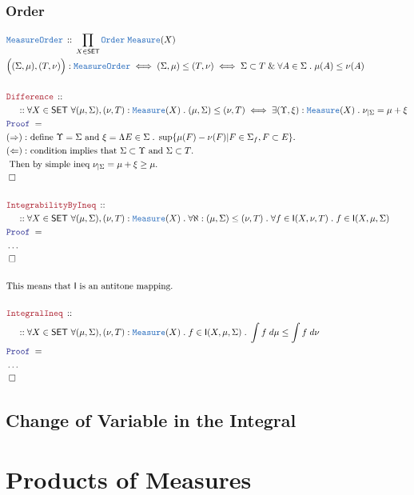 \documentclass[12pt]{scrartcl}
\newcommand{\TYPE}[1]{\textcolor{NavyBlue}{\mathtt{#1}}}
\newcommand{\LOGIC}[1]{\textcolor{Blue}{\mathtt{#1}}}
\newcommand{\THM}[1]{\textcolor{Maroon}{\mathtt{#1}}}
\renewcommand{\.}{\; . \;}
\newcommand{\Theorem}[2]{& \THM{#1} \, :: \, #2 \\ & \Proof = \\ }
\newcommand{\DeclareType}[2]{& \TYPE{#1} \, :: \, #2 \\}
\newcommand{\DefineNamedType}[4]{& #1 : \TYPE{#2} \iff #3 \iff #4 \\}
\newcommand{\NewLine}{\\ & \kern 1pc}
\newcommand{\Page}[1]{ \begin{align*} #1 \end{align*}   }
\newcommand{\NoProof}{ & \ldots \\ \EndProof}
\renewcommand{\And}{\; \& \;}
\newcommand{\QED}{\; \square}
\newcommand{\EndProof}{& \QED \\}
\newcommand{\Proof}{\LOGIC{Proof} \; }
\newcommand{\Explain}[1]{& \text{#1.} \\}
\newcommand{\SET}{\mathsf{SET}}
\newcommand{\Measure}{\TYPE{Measure}}
\newcommand{\Integrable}{\mathsf{I}}
\begin{document}
\subsubsection{Order}
\Page{
	\DeclareType{MeasureOrder}{\prod_{X \in \SET} \TYPE{Order} \; \Measure(X)}
	\DefineNamedType{\Big( (\Sigma,\mu),(T,\nu) \Big)}{MeasureOrder}
	{(\Sigma,\mu) \le (T,\nu)}{\Sigma \subset T  \And \forall A \in \Sigma \. \mu(A) \le \nu(A) }
	\\
	\Theorem{Difference}
	{
		\NewLine :: 		
		\forall X \in \SET \
		\forall (\mu,\Sigma),(\nu,T) : \Measure(X) \.
		(\mu,\Sigma) \le (\nu,T) \iff \exists (\Upsilon, \xi) : \Measure(X) \.
		\nu_{|\Sigma} = \mu + \xi	
	}
	\Explain{$(\Rightarrow):$ define $\Upsilon = \Sigma$ and 
		$\xi = \Lambda E \in \Sigma \.  \sup \{ \mu(F) - \nu(F) | F \in \Sigma_f, F \subset E \}$}
	\Explain{$(\Leftarrow):$ condition implies that $\Sigma \subset \Upsilon$ and 
		$\Sigma \subset T$}
	\Explain{ Then by simple ineq $\nu_{|\Sigma} = \mu + \xi \ge \mu$}
	\EndProof	
	\\
	\Theorem{IntegrabilityByIneq}
	{
		\NewLine ::
		\forall X \in \SET \
		\forall (\mu,\Sigma),(\nu,T) : \Measure(X) \.
		\forall \aleph : (\mu,\Sigma) \le (\nu,T) \.
		\forall f \in \Integrable(X,\nu,T) \.
		f \in \Integrable(X,\mu,\Sigma) 
	}
	\NoProof
	\\
	\Explain{This means that $\Integrable$ is an antitone mapping}
	\\
	\Theorem{IntegralIneq}
	{
		\NewLine ::
		\forall X \in \SET \
		\forall (\mu,\Sigma),(\nu,T) : \Measure(X) \.
		f \in \Integrable(X,\mu,\Sigma)  \.
		\int f \; d\mu \le \int f \; d\nu
	}	
	\NoProof
}
\newpage
\subsection{Change of Variable in the Integral}
\newpage
\section{Products of Measures}
\end{document}
